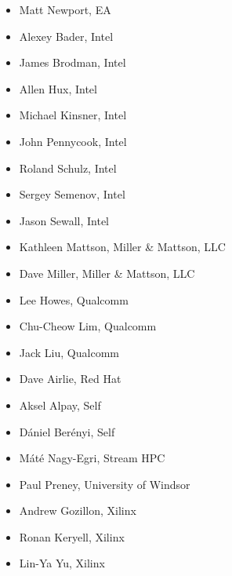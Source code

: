 \begin{multicols}{2}
\begin{itemize}
\item
    Matt Newport, EA
\item
    Alexey Bader, Intel
\item
    James Brodman, Intel
\item
    Allen Hux, Intel
\item
    Michael Kinsner, Intel
\item
    John Pennycook, Intel
\item
    Roland Schulz, Intel
\item
    Sergey Semenov, Intel
\item
    Jason Sewall, Intel
\item
    Kathleen Mattson, Miller \& Mattson, LLC
\item
    Dave Miller, Miller \& Mattson, LLC
\item
    Lee Howes, Qualcomm
\item
    Chu-Cheow Lim, Qualcomm
\item
    Jack Liu, Qualcomm
\item
    Dave Airlie, Red Hat
\item
    Aksel Alpay, Self
\item
    D\'{a}niel Ber\'{e}nyi, Self
\item
    M\'{a}t\'{e} Nagy-Egri, Stream HPC
\item
    Paul Preney, University of Windsor
\item
    Andrew Gozillon, Xilinx
\item
    Ronan Keryell, Xilinx
\item
    Lin-Ya Yu, Xilinx
\end{itemize}
\end{multicols}

